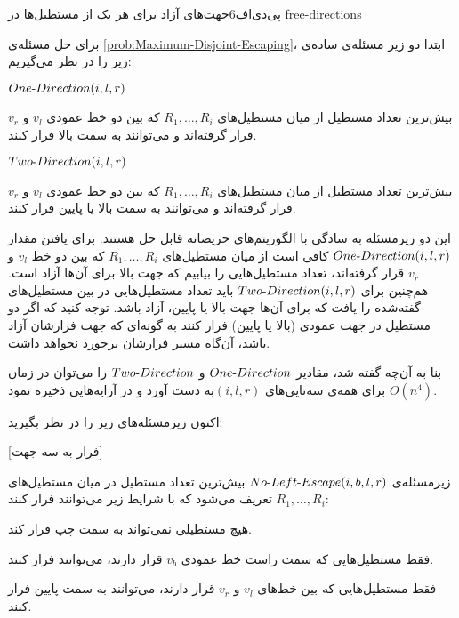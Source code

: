 ‌پی‌دی‌اف{6}{جهت‌های آزاد برای هر یک از مستطیل‌ها در }{free-directions}

برای حل مسئله‌ی \ref{prob:Maximum-Disjoint-Escaping}، ابتدا دو زیر مسئله‌ی ساده‌ی زیر را در نظر می‌گیریم:


 $One \mbox{-} Direction(i, l, r)$

بیش‌ترین تعداد مستطیل از میان مستطیل‌های $R_{1}, \ldots, R_{i}$ که بین دو خط عمودی $v_{l}$ و $v_{r}$ قرار گرفته‌اند و می‌توانند به سمت بالا فرار کنند.

 $Two \mbox{-} Direction(i, l, r)$

بیش‌ترین تعداد مستطیل از میان مستطیل‌های $R_{1}, \ldots, R_{i}$ که بین دو خط عمودی $v_{l}$ و $v_{r}$ قرار گرفته‌اند و می‌توانند به سمت بالا یا پایین فرار کنند.


این دو زیر‌مسئله به سادگی با الگوریتم‌های حریصانه قابل حل هستند. برای یافتن مقدار $One \mbox{-} Direction(i, l, r)$ کافی است از میان مستطیل‌های $R_{1}, \ldots, R_{i}$ که بین دو خط  $v_{l}$ و $v_{r}$ قرار گرفته‌اند، تعداد مستطیل‌هایی را بیابیم که جهت بالا برای آن‌ها آزاد است. هم‌چنین برای $Two \mbox{-} Direction(i, l, r)$ باید تعداد مستطیل‌هایی در بین مستطیل‌های گفته‌شده را یافت که برای آن‌ها جهت بالا یا پایین، آزاد باشد. توجه کنید که اگر دو مستطیل در جهت عمودی (بالا یا پایین) فرار کنند به گونه‌ای که جهت فرارشان آزاد باشد، آن‌گاه مسیر فرارشان برخورد نخواهد داشت.

بنا به آن‌چه گفته شد، مقادیر $One \mbox{-} Direction$ و $Two \mbox{-} Direction$ را می‌توان در زمان $O(n ^ 4)$ برای همه‌ی سه‌تایی‌های $(i, l, r)$به دست آورد و در آرایه‌هایی ذخیره نمود.

اکنون زیر‌مسئله‌های زیر را در نظر بگیرید:

[فرار به سه جهت]
\label{prob:3-Direction}

زیر‌مسئله‌ی $No \mbox{-} Left \mbox{-} Escape(i, b, l, r)$ بیش‌ترین تعداد مستطیل در میان مستطیل‌های $R_{1}, \ldots, R_{i}$ تعریف می‌شود که با شرایط زیر می‌توانند فرار کنند:


 هیچ مستطیلی نمی‌تواند به سمت چپ فرار کند.

 فقط مستطیل‌هایی که سمت راست خط عمودی $v_{b}$ قرار دارند، می‌توانند فرار کنند.

 فقط مستطیل‌هایی که بین خط‌های $v_{l}$ و $v_{r}$ قرار دارند، می‌توانند به سمت پایین فرار کنند.

